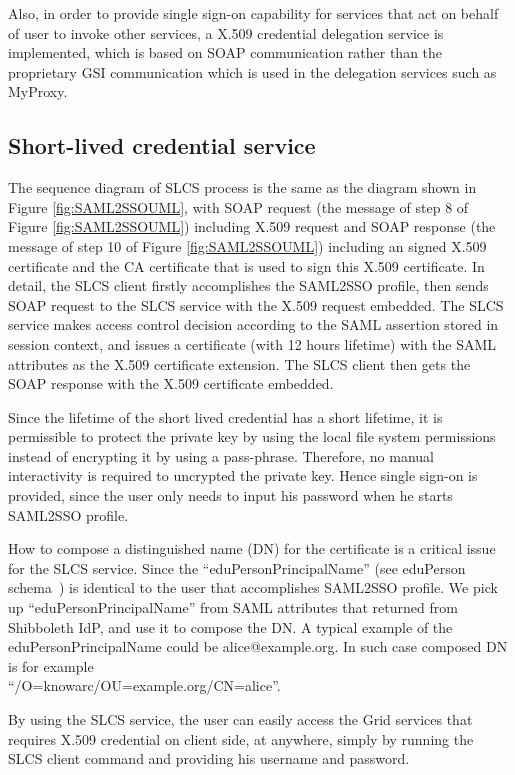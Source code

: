 \documentclass[conference]{IEEEtran}
\begin{document}
Also, in order to provide single sign-on capability for services that act on behalf of user to 
invoke other services, a X.509 credential delegation service is implemented, which is based on 
SOAP communication rather than the proprietary GSI communication which is used in the delegation
services such as MyProxy.

\subsection{Short-lived credential service}
\label{sec:slcs}
The sequence diagram of SLCS process is the same as the diagram shown in 
Figure \ref{fig:SAML2SSOUML}, with SOAP request (the message of step 8 of 
Figure \ref{fig:SAML2SSOUML}) including X.509 request 
and SOAP response (the message of step 10 of Figure \ref{fig:SAML2SSOUML}) 
including an signed X.509 certificate and the CA certificate that is used to 
sign this X.509 certificate. 
In detail, the SLCS client firstly accomplishes the SAML2SSO profile, then sends 
SOAP request to the SLCS service with the X.509 request embedded. The SLCS service makes
access control decision according to the SAML assertion stored in session context, and issues 
a certificate (with 12 hours lifetime) with the SAML attributes as the X.509 certificate 
extension. The SLCS client then gets the SOAP response with the X.509 certificate embedded.

Since the lifetime of the short lived credential has a short lifetime, it is permissible to protect 
the private key by using the local file system permissions instead of encrypting it by 
using a pass-phrase. Therefore, no manual interactivity is required to uncrypted the private
key. Hence single sign-on is provided, since the user only needs to input his password when 
he starts SAML2SSO profile.

How to compose a distinguished name (DN) for the certificate is a critical issue for 
the SLCS service. Since the ``eduPersonPrincipalName'' (see eduPerson schema~\cite{eduSchemalink})
is identical to the user that accomplishes SAML2SSO profile. We pick up ``eduPersonPrincipalName'' 
from SAML attributes that returned from Shibboleth IdP, and use it to compose the DN. A 
typical example of the eduPersonPrincipalName 
could be alice@example.org. In such case composed DN is for example\\``/O=knowarc/OU=example.org/CN=alice''.

By using the SLCS service, the user can easily access the Grid services that requires 
X.509 credential on client side, at anywhere, simply by running the SLCS client command 
and providing his username and password.
\end{document}
